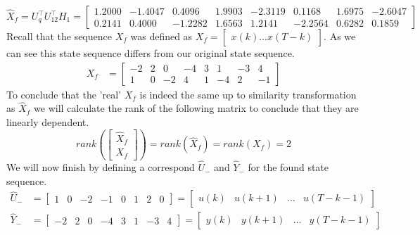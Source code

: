 \begin{equation*}
	\hat{X}_f = U_q^\top U_{12}^\top H_1 = 
	\begin{bmatrix}
		1.2000 &  -1.4047 &   0.4096 &   1.9903 &  -2.3119 &   0.1168 &   1.6975 &  -2.6047\\
		0.2141 &   0.4000 &  -1.2282 &   1.6563 &   1.2141 &  -2.2564 &   0.6282 &   0.1859
	\end{bmatrix}
\end{equation*}
Recall that the sequence $X_f$ was defined as $X_f = \begin{bmatrix} x(k) \dots x(T-k) \end{bmatrix}$. As we can see this state sequence differs from our original state sequence.
\begin{align*}
	X_f &= \begin{bmatrix} -2  &   2  &   0  &  -4  &   3  &   1  &  -3  &   4 \\
							1  &   0  &  -2  &   4  &   1  &  -4  &   2  &  -1 \end{bmatrix}
\end{align*}
To conclude that the 'real' $X_f$ is indeed the same up to similarity transformation as $\hat{X}_f$ we will calculate the rank of the following matrix to conclude that they are linearly dependent.
\begin{equation*}
	rank\left(\begin{bmatrix} \hat{X}_f \\ X_f \end{bmatrix}\right) = rank \left( \hat{X}_f \right) = rank \left( X_f \right) = 2
\end{equation*}
We will now finish by defining a correspond $\hat{U}_-$ and $\hat{Y}_-$ for the found state sequence.
\begin{align*}
	\hat{U}_- &= \begin{bmatrix} 1&0&-2&-1&0&1&2&0 \end{bmatrix} = \begin{bmatrix} u(k) & u(k+1) & \dots & u(T-k-1) \end{bmatrix}\\
	\hat{Y}_- &= \begin{bmatrix} -2&2&0&-4&3&1&-3&4 \end{bmatrix} = \begin{bmatrix} y(k) & y(k+1) & \dots & y(T-k-1) \end{bmatrix}
\end{align*}

